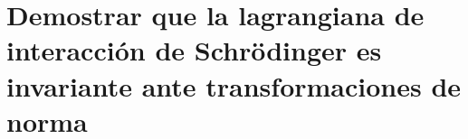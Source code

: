 \section{Demostrar que la lagrangiana de interacción de Schrödinger es invariante ante
transformaciones de norma}
